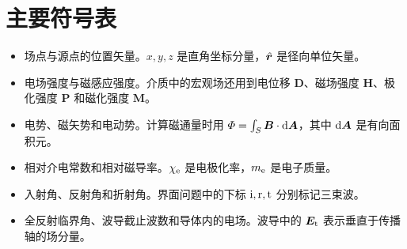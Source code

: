 \chapter{主要符号表}

\begin{itemize}[align=left]
    \item[$\bm r,\bm r'$] 场点与源点的位置矢量。$x,y,z$ 是直角坐标分量，$\mathop{}\!\hat{\bm{r}}$ 是径向单位矢量。
    \item[$\bm E,\bm B$] 电场强度与磁感应强度。介质中的宏观场还用到电位移 $\bm D$、磁场强度 $\bm H$、极化强度 $\bm P$ 和磁化强度 $\bm M$。
    \item[$\Phi,\bm A,\emf$] 电势、磁矢势和电动势。计算磁通量时用 $\textstyle \varPhi = \int_S\bm B \cdot \mathop{}\!\mathrm{d}\bm A$，其中 $\mathop{}\!\mathrm{d}\bm A$ 是有向面积元。
    \item[$\varepsilon_\relative,\mu_\relative$] 相对介电常数和相对磁导率。$\chi_\mathrm e$ 是电极化率，$m_{\mathrm{e}}$ 是电子质量。
    \item[$\theta_\incident,\theta_\reflected,\theta_\transmitted$] 入射角、反射角和折射角。界面问题中的下标 $\mathrm i,\mathrm r,\mathrm t$ 分别标记三束波。
    \item[$\theta_\critical,k_\cutoff,\bm E_\conductor$] 全反射临界角、波导截止波数和导体内的电场。波导中的 $\bm E_\mathrm t$ 表示垂直于传播轴的场分量。
\end{itemize}

